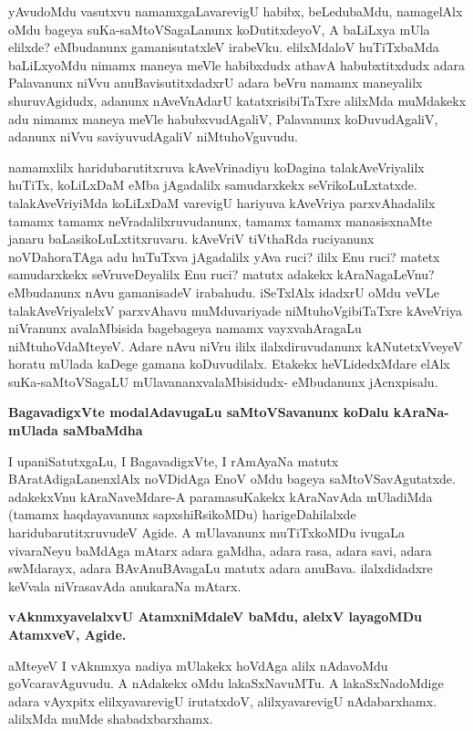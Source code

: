 \noindent
yAvudoMdu vasutxvu namamxgaLavarevigU habibx, beLedubaMdu, namagelAlx oMdu bageya suKa-saMtoVSagaLanunx koDutitxdeyoV, A baLiLxya mUla elilxde? eMbudanunx gamanisutatxleV irabeVku. elilxMdaloV huTiTxbaMda baLiLxyoMdu nimamx maneya meVle habibxdudx athavA habubxtitxdudx adara Palavanunx niVvu anuBavisutitxdadxrU adara beVru namamx maneyalilx shuruvAgidudx, adanunx nAveVnAdarU katatxrisibiTaTxre alilxMda muMdakekx adu nimamx maneya meVle habubxvudAgaliV, Palavanunx koDuvudAgaliV, adanunx niVvu saviyuvudAgaliV niMtuhoVguvudu. 

namamxlilx haridubarutitxruva kAveVrinadiyu koDagina talakAveVriyalilx huTiTx, koLiLxDaM eMba jAgadalilx samudarxkekx seVrikoLuLxtatxde. talakAveVriyiMda koLiLxDaM varevigU hariyuva kAveVriya parxvAhadalilx tamamx tamamx neVradalilxruvudanunx, tamamx tamamx manasisxnaMte janaru baLasikoLuLxtitxruvaru. kAveVriV tiVthaRda ruciyanunx noVDahoraTAga adu huTuTxva jAgadalilx yAva ruci? ililx Enu ruci? matetx samudarxkekx seVruveDeyalilx Enu ruci? matutx adakekx kAraNagaLeVnu? eMbudanunx nAvu gamanisadeV irabahudu. iSeTxlAlx idadxrU oMdu veVLe talakAveVriyalelxV parxvAhavu muMduvariyade niMtuhoVgibiTaTxre kAveVriya niVranunx avalaMbisida bagebageya namamx vayxvahAragaLu niMtuhoVdaMteyeV. Adare nAvu niVru ililx ilalxdiruvudanunx kANutetxVveyeV horatu mUlada kaDege gamana koDuvudilalx. Etakekx heVLidedxMdare elAlx suKa-saMtoVSagaLU mUlavananxvalaMbisidudx- eMbudanunx jAcnxpisalu.

{\medskip
\noindent
{\large\bf BagavadigxVte modalAdavugaLu saMtoVSavanunx koDalu kAraNa-mUlada saMbaMdha}}\label{page195}
\smallskip

\noindent
I upaniSatutxgaLu, I BagavadigxVte, I rAmAyaNa matutx BAratAdigaLanenxlAlx noVDidAga EnoV oMdu bageya saMtoVSavAgutatxde. adakekxVnu kAraNaveMdare-A paramasuKakekx kAraNavAda mUladiMda (tamamx haqdayavanunx sapxshiRsikoMDu) harigeDahilalxde haridubarutitxruvudeV Agide. A mUlavanunx muTiTxkoMDu ivugaLa vivaraNeyu baMdAga mAtarx adara gaMdha, adara rasa, adara savi, adara swMdarayx, adara BAvAnuBAvagaLu matutx adara anuBava. ilalxdidadxre keVvala niVrasavAda  anukaraNa mAtarx.

{\medskip
\noindent
{\large\bf vAknmxyavelalxvU AtamxniMdaleV baMdu, alelxV layagoMDu AtamxveV, Agide.}}\label{195}
\smallskip

\noindent
aMteyeV I vAknmxya nadiya mUlakekx hoVdAga alilx nAdavoMdu goVcaravAguvudu. A nAdakekx oMdu lakaSxNavuMTu. A lakaSxNadoMdige adara vAyxpitx elilxyavarevigU irutatxdoV, alilxyavarevigU nAdabarxhamx. alilxMda muMde shabadxbarxhamx. 


